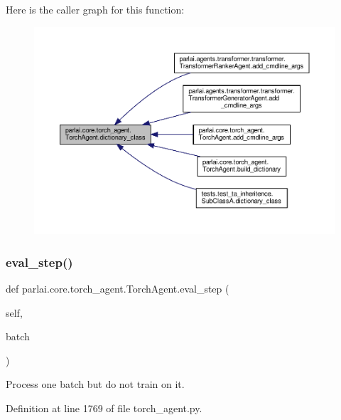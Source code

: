 Here is the caller graph for this function\+:
\nopagebreak
\begin{figure}[H]
\begin{center}
\leavevmode
\includegraphics[width=350pt]{classparlai_1_1core_1_1torch__agent_1_1TorchAgent_aea8849fa69a3f5dbd3216c8b06f180ea_icgraph}
\end{center}
\end{figure}
\mbox{\label{classparlai_1_1core_1_1torch__agent_1_1TorchAgent_a18de0a52aeec4ef721aedbdd6ac06cad}} 
\subsubsection{\texorpdfstring{eval\+\_\+step()}{eval\_step()}}
{\footnotesize\ttfamily def parlai.\+core.\+torch\+\_\+agent.\+Torch\+Agent.\+eval\+\_\+step (\begin{DoxyParamCaption}\item[{}]{self,  }\item[{}]{batch }\end{DoxyParamCaption})}

\begin{DoxyVerb}[Abstract] Process one batch but do not train on it.\end{DoxyVerb}
 

Definition at line 1769 of file torch\+\_\+agent.\+py.



